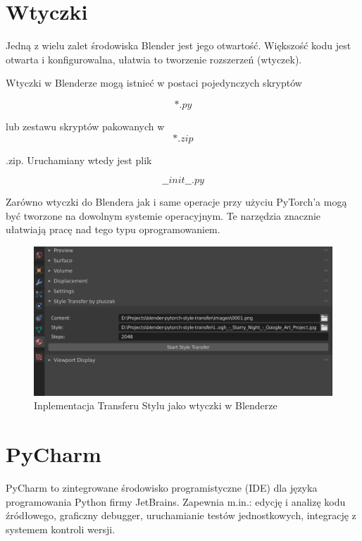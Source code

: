 \documentclass[brudnopis]{xmgr}
\begin{document}
\section{Wtyczki\label{s:dsssl}}

Jedną z wielu zalet środowiska Blender jest jego otwartość. Większość kodu jest otwarta i konfigurowalna, ułatwia to tworzenie rozszerzeń (wtyczek).



Wtyczki w Blenderze mogą istnieć w postaci pojedynczych skryptów 

\begin{equation}
*.py
\end{equation}

lub zestawu skryptów pakowanych w 
\begin{equation}
*.zip
\end{equation}

.zip. Uruchamiany wtedy jest plik 

\begin{equation}
\_\_init\_\_.py
\end{equation}


Zarówno wtyczki do Blendera jak i same operacje przy użyciu PyTorch’a mogą być tworzone na dowolnym systemie operacyjnym. Te narzędzia znacznie ułatwiają pracę nad tego typu oprogramowaniem.

\begin{figure}[!tbh]
\centering
\includegraphics[width=.8\hsize]{fig/9}
\caption{Inplementacja Transferu Stylu jako wtyczki w Blenderze\label{RYS.9}}
\end{figure}

\section{PyCharm\label{s:dsssl}}
 PyCharm to zintegrowane środowisko programistyczne (IDE) dla języka programowania Python firmy JetBrains. Zapewnia m.in.: edycję i analizę kodu źródłowego, graficzny debugger, uruchamianie testów jednostkowych, integrację z systemem kontroli wersji.
 
\end{document}
